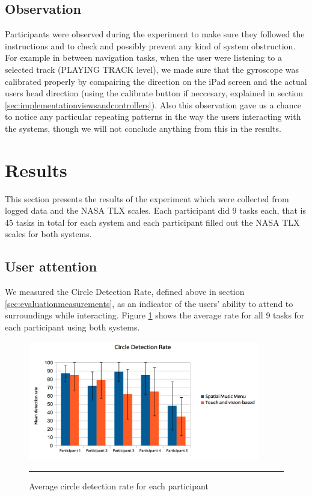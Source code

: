 \subsection{Observation}
Participants were observed during the experiment to make sure they followed the instructions and to check and possibly prevent any kind of system obstruction. For example in between navigation tasks, when the user were listening to a selected track (PLAYING TRACK level), we made sure that the gyroscope was calibrated properly by compairing the direction on the iPad screen and the actual users head direction (using the calibrate button if neccesary, explained in section \ref{sec:implementationviewsandcontrollers}). Also this observation gave us a chance to notice any particular repeating patterns in the way the users interacting with the systems, though we will not conclude anything from this in the results.


\section{Results}
This section presents the results of the experiment which were collected from logged data and the NASA TLX scales. Each participant did 9 tasks each, that is 45 tasks in total for each system and each participant filled out the NASA TLX scales for both systems.

\subsection{User attention}
We measured the Circle Detection Rate, defined above in section \ref{sec:evaluationmeasurements}, as an indicator of the users' ability to attend to surroundings while interacting. Figure \ref{fig:resultscircles} shows the average rate for all 9 tasks for each participant using both systems.

\begin{figure}[h]
	\centering
		\includegraphics[width=0.9\textwidth,height=\textheight,keepaspectratio]{./Figures/results_circledetections.png}
		\rule{35em}{1pt}
	\caption[Results Circle Detection Rate]{Average circle detection rate for each participant}
	\label{fig:resultscircles}
\end{figure}

